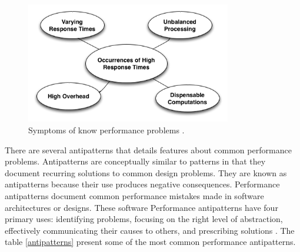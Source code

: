 \begin{figure}[h]
\centering
\includegraphics[width=0.8\textwidth]{./images/symptoms.png}
\caption{Symptoms of know performance problems \cite{Wert2013a}. }
\label{fig:symptoms}
\end{figure}


There are several antipatterns that details features about  common performance problems. Antipatterns are conceptually similar to patterns in that they document recurring solutions to common design problems. They are known as
antipatterns because their use produces negative consequences.  Performance antipatterns document common performance mistakes made in software architectures or designs. These software Performance antipatterns have four primary uses: identifying problems,
focusing on the
right level of abstraction,
effectively communicating
their causes to others, and prescribing solutions \cite{brown1998antipatterns}. The table \ref{antipatterns} present some of the most common performance antipatterns.


